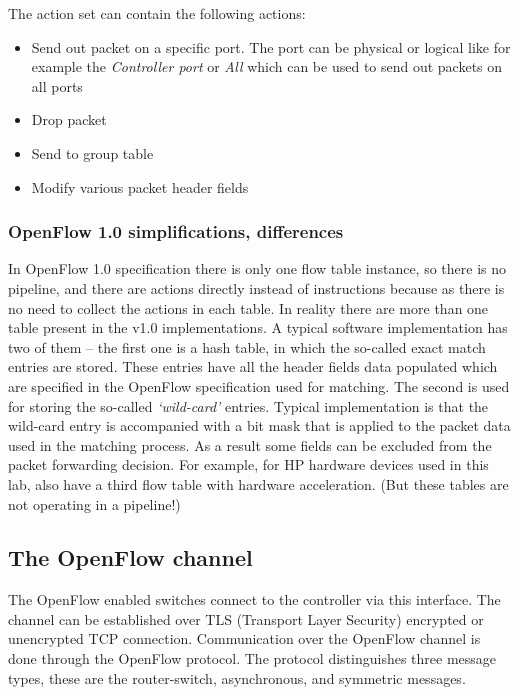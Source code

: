 \documentclass[a4paper]{article}
\begin{document}
The action set can contain the following actions:
\begin{itemize}
    \item Send out packet on a specific port. The port can be physical or logical like for example the
          \emph{Controller port} or \emph{All} which can be used to send out packets on all ports
    \item Drop packet
    \item Send to group table
    \item Modify various packet header fields
\end{itemize}

\subsubsection{OpenFlow 1.0 simplifications, differences}

In OpenFlow 1.0 specification there is only one flow table instance, so there is no pipeline, and there are actions
directly instead of instructions because as there is no need to collect the actions in each table. In reality there are
more than one table present in the v1.0 implementations. A typical software implementation has two of them -- the first
one is a hash table, in which the so-called exact match entries are stored. These entries have all the header fields
data populated which are specified in the OpenFlow specification used for matching. The second is used for storing the
so-called \emph{`wild-card'} entries. Typical implementation is that the wild-card entry is accompanied with a bit mask
that is applied to the packet data used in the matching process. As a result some fields can be excluded from the
packet forwarding decision.  For example, for HP hardware devices used in this lab, also have a third flow table with
hardware acceleration. (But these tables are not operating in a pipeline!)

\subsection{The OpenFlow channel}

The OpenFlow enabled switches connect to the controller via this interface. The channel can be established over TLS
(Transport Layer Security) encrypted or unencrypted TCP connection. Communication over the OpenFlow channel is done
through the OpenFlow protocol. The protocol distinguishes three message types, these are the router-switch,
asynchronous, and symmetric messages.
\end{document}
